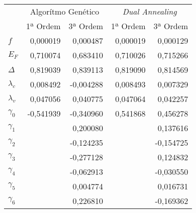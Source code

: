 \begin{tabular}{lrrrr}
\toprule
{} & \multicolumn{2}{c}{Algorítmo Genético} & \multicolumn{2}{c}{\textit{Dual Annealing}} \\
{} &           1ª Ordem &  3ª Ordem &                1ª Ordem &  3ª Ordem \\
\midrule
$f$         &           0,000019 &  0,000487 &                0,000019 &  0,000129 \\
$E_F$       &           0,710074 &  0,683410 &                0,710026 &  0,715266 \\
$\Delta$    &           0,819039 &  0,839113 &                0,819090 &  0,814569 \\
$\lambda_c$ &           0,008492 & -0,004288 &                0,008493 &  0,007329 \\
$\lambda_v$ &           0,047056 &  0,040775 &                0,047064 &  0,042257 \\
$\gamma_0$  &          -0,541939 & -0,340960 &                0,541868 &  0,456278 \\
$\gamma_1$  &                    &  0,200080 &                         &  0,137616 \\
$\gamma_2$  &                    & -0,124235 &                         & -0,154725 \\
$\gamma_3$  &                    & -0,277128 &                         &  0,124832 \\
$\gamma_4$  &                    & -0,062913 &                         & -0,030550 \\
$\gamma_5$  &                    &  0,004774 &                         &  0,016731 \\
$\gamma_6$  &                    &  0,226810 &                         & -0,169362 \\
\bottomrule
\end{tabular}
